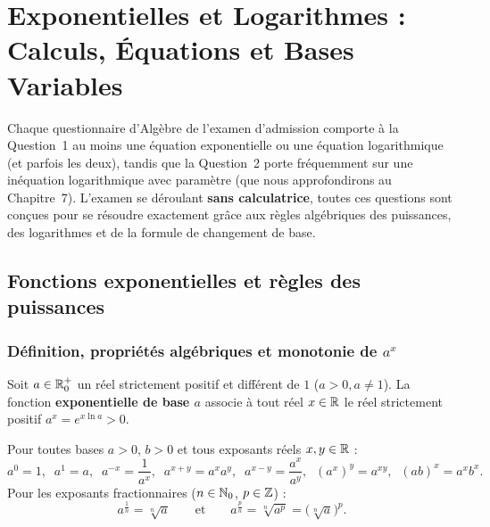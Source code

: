 \chapter{Exponentielles et Logarithmes : Calculs, Équations et Bases Variables}

Chaque questionnaire d'Algèbre de l'examen d'admission comporte à la Question~1 au moins une équation exponentielle ou une équation logarithmique (et parfois les deux), tandis que la Question~2 porte fréquemment sur une inéquation logarithmique avec paramètre (que nous approfondirons au Chapitre~7). L'examen se déroulant \textbf{sans calculatrice}, toutes ces questions sont conçues pour se résoudre exactement grâce aux règles algébriques des puissances, des logarithmes et de la formule de changement de base.

\section{Fonctions exponentielles et règles des puissances}

\subsection{Définition, propriétés algébriques et monotonie de $a^x$}

\begin{definition}
Soit $a \in \mathbb{R}_0^+$ un réel strictement positif et différent de $1$ ($a > 0, a \neq 1$). La fonction \textbf{exponentielle de base $a$} associe à tout réel $x \in \mathbb{R}$ le réel strictement positif $a^x = e^{x \ln a} > 0$.
\end{definition}

\begin{theoreme}
Pour toutes bases $a > 0$, $b > 0$ et tous exposants réels $x, y \in \mathbb{R}$ :
\[
    \boxed{a^0 = 1, \;\; a^1 = a, \;\; a^{-x} = \frac{1}{a^x}, \;\; a^{x+y} = a^x a^y, \;\; a^{x-y} = \frac{a^x}{a^y}, \;\; (a^x)^y = a^{xy}, \;\; (ab)^x = a^x b^x}.
\]
Pour les exposants fractionnaires ($n \in \mathbb{N}_0$, $p \in \mathbb{Z}$) :
\[
    \boxed{a^{\frac{1}{n}} = \sqrt[n]{a} \qquad \text{et} \qquad a^{\frac{p}{n}} = \sqrt[n]{a^p} = \bigl(\sqrt[n]{a}\bigr)^p}.
\]
\end{theoreme}

